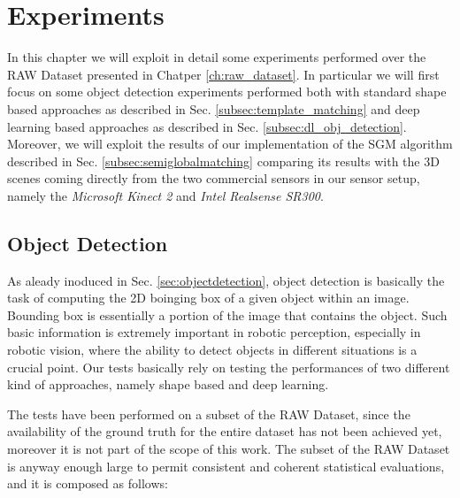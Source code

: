 \chapter{Experiments}\label{ch:experiments}
In this chapter we will exploit in detail some experiments performed over the RAW Dataset presented in Chatper \ref{ch:raw_dataset}. In particular we will first focus on some object detection experiments performed both with standard shape based approaches as described in Sec. \ref{subsec:template_matching} and deep learning based approaches as described in Sec. \ref{subsec:dl_obj_detection}. Moreover, we will exploit the results of our implementation of the SGM algorithm described in Sec. \ref{subsec:semiglobalmatching} comparing its results with the 3D scenes coming directly from the two commercial sensors in our sensor setup, namely the \emph{Microsoft Kinect 2} and \emph{Intel Realsense SR300}.


\section{Object Detection}\label{sec:exp_object_detection}
As aleady inoduced in Sec. \ref{sec:objectdetection}, object detection is basically the task of computing the 2D boinging box of a given object within an image. Bounding box is essentially a portion of the image that contains the object. Such basic information is extremely important in robotic perception, especially in robotic vision, where the ability to detect objects in different situations is a crucial point. Our tests basically rely on testing the performances of two different kind of approaches, namely shape based and deep learning.

The tests have been performed on a subset of the RAW Dataset, since the availability of the ground truth for the entire dataset has not been achieved yet, moreover it is not part of the scope of this work. The subset of the RAW Dataset is anyway enough large to permit consistent and coherent statistical evaluations, and it is composed as follows:

